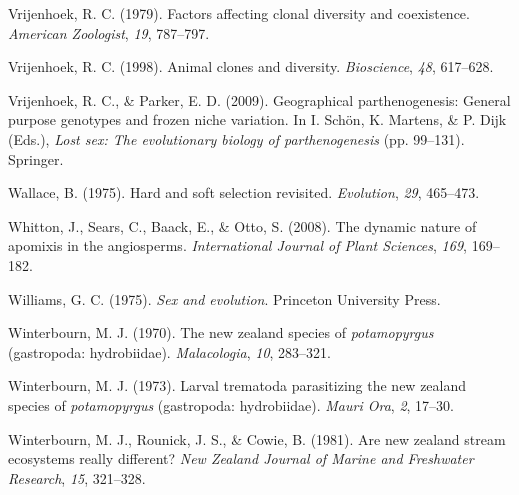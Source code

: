 \documentclass[
  letterpaper,
]{book}
\newlength{\cslhangindent}
\newlength{\cslentryspacingunit} %
\newenvironment{CSLReferences}[2] %
 {%
  \setlength{\parindent}{0pt}
  \ifodd #1
  \let\oldpar\par
  \def\par{\hangindent=\cslhangindent\oldpar}
  \fi
  \setlength{\parskip}{#2\cslentryspacingunit}
 }%
 {}
\begin{document}
\begin{CSLReferences}{1}{0}
\leavevmode{}%
Vrijenhoek, R. C. (1979). Factors affecting clonal diversity and
coexistence. \emph{American Zoologist}, \emph{19}, 787--797.

\leavevmode{}%
Vrijenhoek, R. C. (1998). Animal clones and diversity.
\emph{Bioscience}, \emph{48}, 617--628.

\leavevmode{}%
Vrijenhoek, R. C., \& Parker, E. D. (2009). Geographical
parthenogenesis: General purpose genotypes and frozen niche variation.
In I. Schön, K. Martens, \& P. Dijk (Eds.), \emph{Lost sex: The
evolutionary biology of parthenogenesis} (pp. 99--131). Springer.

\leavevmode{}%
Wallace, B. (1975). Hard and soft selection revisited. \emph{Evolution},
\emph{29}, 465--473.

\leavevmode{}%
Whitton, J., Sears, C., Baack, E., \& Otto, S. (2008). The dynamic
nature of apomixis in the angiosperms. \emph{International Journal of
Plant Sciences}, \emph{169}, 169--182.

\leavevmode{}%
Williams, G. C. (1975). \emph{Sex and evolution}. Princeton University
Press.

\leavevmode{}%
Winterbourn, M. J. (1970). The new zealand species of
\emph{potamopyrgus} (gastropoda: hydrobiidae). \emph{Malacologia},
\emph{10}, 283--321.

\leavevmode{}%
Winterbourn, M. J. (1973). Larval trematoda parasitizing the new zealand
species of \emph{potamopyrgus} (gastropoda: hydrobiidae). \emph{Mauri
Ora}, \emph{2}, 17--30.

\leavevmode{}%
Winterbourn, M. J., Rounick, J. S., \& Cowie, B. (1981). Are new zealand
stream ecosystems really different? \emph{New Zealand Journal of Marine
and Freshwater Research}, \emph{15}, 321--328.

\end{CSLReferences}


\backmatter
\end{document}
